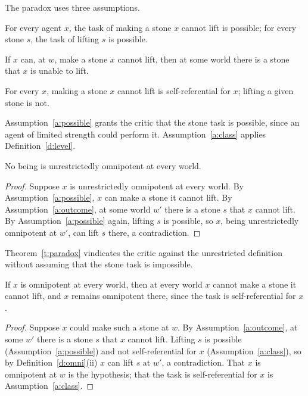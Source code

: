 \documentclass{situationist-preprint}
\begin{document}
The paradox uses three assumptions.

\begin{assumption}\label{a:possible}
For every agent $x$, the task of making a stone $x$ cannot lift is possible; for every stone $s$, the task of lifting $s$ is possible.
\end{assumption}

\begin{assumption}\label{a:outcome}
If $x$ can, at $w$, make a stone $x$ cannot lift, then at some world there is a stone that $x$ is unable to lift.
\end{assumption}

\begin{assumption}\label{a:class}
For every $x$, making a stone $x$ cannot lift is self-referential for $x$; lifting a given stone is not.
\end{assumption}

Assumption~\ref{a:possible} grants the critic that the stone task is possible, since an agent of limited strength could perform it. Assumption~\ref{a:class} applies Definition~\ref{d:level}.

\begin{theorem}\label{t:paradox}
No being is unrestrictedly omnipotent at every world.
\end{theorem}

\begin{proof}
Suppose $x$ is unrestrictedly omnipotent at every world. By Assumption~\ref{a:possible}, $x$ can make a stone it cannot lift. By Assumption~\ref{a:outcome}, at some world $w'$ there is a stone $s$ that $x$ cannot lift. By Assumption~\ref{a:possible} again, lifting $s$ is possible, so $x$, being unrestrictedly omnipotent at $w'$, can lift $s$ there, a contradiction.
\end{proof}

Theorem~\ref{t:paradox} vindicates the critic against the unrestricted definition without assuming that the stone task is impossible.

\begin{theorem}\label{t:stone}
If $x$ is omnipotent at every world, then at every world $x$ cannot make a stone it cannot lift, and $x$ remains omnipotent there, since the task is self-referential for $x$.
\end{theorem}

\begin{proof}
Suppose $x$ could make such a stone at $w$. By Assumption~\ref{a:outcome}, at some $w'$ there is a stone $s$ that $x$ cannot lift. Lifting $s$ is possible (Assumption~\ref{a:possible}) and not self-referential for $x$ (Assumption~\ref{a:class}), so by Definition~\ref{d:omni}(ii) $x$ can lift $s$ at $w'$, a contradiction. That $x$ is omnipotent at $w$ is the hypothesis; that the task is self-referential for $x$ is Assumption~\ref{a:class}.
\end{proof}
\end{document}
